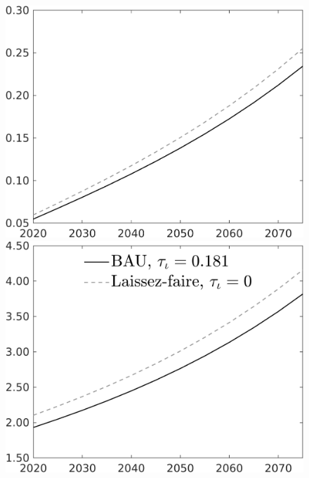 \documentclass[12pt]{article}
\begin{document}
\begin{figure}[h!!]
\begin{minipage}[]{0.32\textwidth}
\end{minipage}	
\begin{minipage}[]{0.32\textwidth}
\includegraphics[width=1\textwidth]{../../codding_model/own_basedOnFried/optimalPol_010922_revision/figures/all_13Sept22/CompTaul_Equlab_LFBAU_Reg0_G_spillover0_nsk1_xgr1_knspil0_sep1_countec0_GovRev0_etaa0.79_lgd0.png}
\end{minipage}	
\begin{minipage}[]{0.32\textwidth}
\includegraphics[width=1\textwidth]{../../codding_model/own_basedOnFried/optimalPol_010922_revision/figures/all_13Sept22/CompTaul_Equlab_LFBAU_Reg0_N_spillover0_nsk1_xgr1_knspil0_sep1_countec0_GovRev0_etaa0.79_lgd1.png}
\end{minipage}	
\end{figure}
\end{document}
